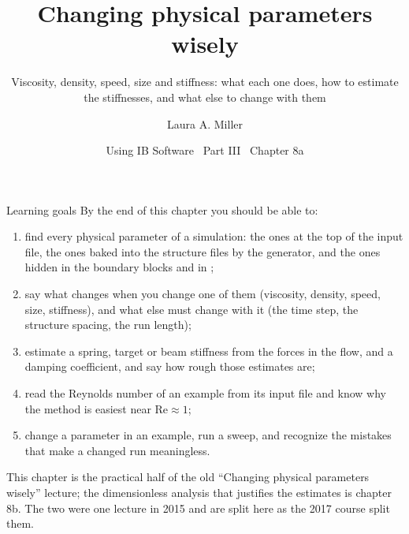 \documentclass[aspectratio=169,11pt]{beamer}
\title[Changing physical parameters wisely]{Changing physical parameters wisely}
\subtitle{Viscosity, density, speed, size and stiffness: what each one does, how to estimate the stiffnesses, and what else to change with them}
\author[Miller]{Laura A. Miller}
\institute[UArizona]{Department of Mathematics, University of Arizona}
\date{Using IB Software \textbullet\ Part III \textbullet\ Chapter 8a}
\begin{document}
\begin{frame}[plain]
\end{frame}

\begin{frame}{Learning goals}
\label{fr:goals}
\small By the end of this chapter you should be able to:
\begin{enumerate}
  \item find every physical parameter of a simulation: the ones at the top of the input file, the ones baked into the structure files by the generator, and the ones hidden in the boundary blocks and in ;
  \item say what changes when you change one of them (viscosity, density, speed, size, stiffness), and what else must change with it (the time step, the structure spacing, the run length);
  \item estimate a spring, target or beam stiffness from the forces in the flow, and a damping coefficient, and say how rough those estimates are;
  \item read the Reynolds number of an example from its input file and know why the method is easiest near $\mathrm{Re} \approx 1$;
  \item change a parameter in an example, run a sweep, and recognize the mistakes that make a changed run meaningless.
\end{enumerate}
\begin{punchbox}
\small This chapter is the practical half of the old ``Changing physical parameters wisely'' lecture; the dimensionless analysis that justifies the estimates is chapter 8b. The two were one lecture in 2015 and are split here as the 2017 course split them.
\end{punchbox}
\end{frame}
\end{document}
